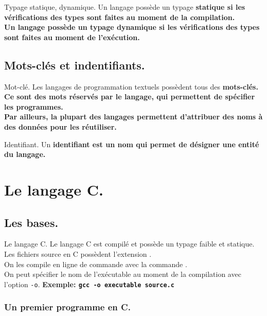 \documentclass[french, 11pt]{article}
\begin{document}
\begin{defi}{Typage statique, dynamique.}{}
    Un langage possède un typage \bf{statique} si les vérifications des types sont faites au moment de la compilation.\\
    Un langage possède un typage \bf{dynamique} si les vérifications des types sont faites au moment de l'exécution.
\end{defi}

\subsection{Mots-clés et indentifiants.}

\begin{defi}{Mot-clé.}{}
    Les langages de programmation textuels possèdent tous des \bf{mots-clés}. Ce sont des mots réservés par le langage, qui permettent de spécifier les programmes.\\
    Par ailleurs, la plupart des langages permettent d'attribuer des noms à des données pour les réutiliser.
\end{defi}

\begin{defi}{Identifiant.}{}
    Un \bf{identifiant} est un nom qui permet de désigner une entité du langage.
\end{defi}

\section{Le langage C.}

\subsection{Les bases.}

\begin{defi}{Le langage C.}{}
    Le langage C est compilé et possède un typage faible et statique.\\
    Les fichiers source en C possèdent l'extension .\\
    On les compile en ligne de commande avec la commande .\\
    On peut spécifier le nom de l'exécutable au moment de la compilation avec l'option \texttt{-o}.\n
    \bf{Exemple:} \texttt{gcc -o executable source.c}
\end{defi}

\subsubsection{Un premier programme en C.}
\end{document}
